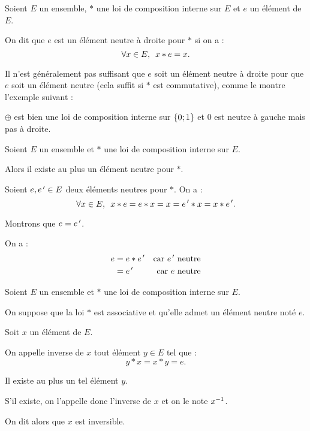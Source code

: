 \begin{rem}
Soient \(E\) un ensemble, \(*\) une loi de composition interne sur \(E\) et \(e\) un élément de \(E\).

On dit que \(e\) est un élément neutre à droite pour \(*\) si on a : \[\quantifs{\forall x\in E}x*e=x.\]

Il n'est généralement pas suffisant que \(e\) soit un élément neutre à droite pour que \(e\) soit un élément neutre (cela suffit si \(*\) est commutative), comme le montre l'exemple suivant :

\begin{center}
\end{center}

\(\oplus\) est bien une loi de composition interne sur \(\left\lbrace0;1\right\rbrace\) et \(0\) est neutre à gauche mais pas à droite.
\end{rem}

\begin{prop}
Soient \(E\) un ensemble et \(*\) une loi de composition interne sur \(E\).

Alors il existe au plus un élément neutre pour \(*\).
\end{prop}

\begin{dem}
Soient \(e,e^{\,\prime}\in E\) deux éléments neutres pour \(*\). On a : \[\quantifs{\forall x\in E}x*e=e*x=x=e\prim*x=x*e\prim.\]

Montrons que \(e=e^{\,\prime}\).

On a : \[\begin{aligned}
e&=e*e^{\,\prime}&\text{car }e^{\,\prime}\text{ neutre} \\
&=e^{\,\prime}&\text{car }e\text{ neutre}
\end{aligned}\]
\end{dem}

\begin{defprop}
Soient \(E\) un ensemble et \(*\) une loi de composition interne sur \(E\).

On suppose que la loi \(*\) est associative et qu'elle admet un élément neutre noté \(e\).

Soit \(x\) un élément de \(E\).

On appelle inverse de \(x\) tout élément \(y\in E\) tel que : \[y*x=x*y=e.\]

Il existe au plus un tel élément \(y\).

S'il existe, on l'appelle donc l'inverse de \(x\) et on le note \(x^{-1}\).

On dit alors que \(x\) est inversible.
\end{defprop}

